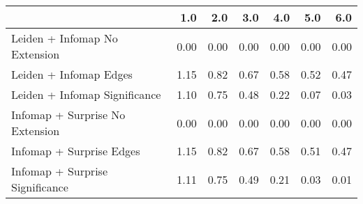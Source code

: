 \begin{tabular}{lrrrrrr}
\toprule
{} &  1.0 &  2.0 &  3.0 &  4.0 &  5.0 &  6.0 \\
\midrule
Leiden + Infomap No Extension   & 0.00 & 0.00 & 0.00 & 0.00 & 0.00 & 0.00 \\
Leiden + Infomap Edges          & 1.15 & 0.82 & 0.67 & 0.58 & 0.52 & 0.47 \\
Leiden + Infomap Significance   & 1.10 & 0.75 & 0.48 & 0.22 & 0.07 & 0.03 \\
Infomap + Surprise No Extension & 0.00 & 0.00 & 0.00 & 0.00 & 0.00 & 0.00 \\
Infomap + Surprise Edges        & 1.15 & 0.82 & 0.67 & 0.58 & 0.51 & 0.47 \\
Infomap + Surprise Significance & 1.11 & 0.75 & 0.49 & 0.21 & 0.03 & 0.01 \\
\bottomrule
\end{tabular}
